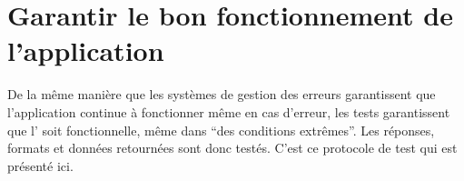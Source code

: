 \section{Garantir le bon fonctionnement de l'application}
De la même manière que les systèmes de gestion des erreurs garantissent que l'application continue à fonctionner même en cas d'erreur, les tests garantissent que l'\api{} soit fonctionnelle, même dans \enquote{des conditions extrêmes}. Les réponses, formats et données retournées sont donc testés. C'est ce protocole de test qui est présenté ici.